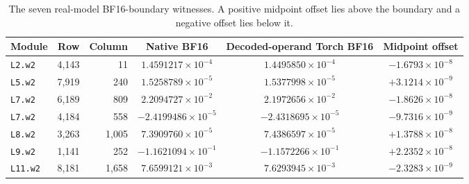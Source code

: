 \documentclass[11pt]{article}
\begin{document}
\begin{table}[H]
  \centering
  \scriptsize
  \caption{The seven real-model BF16-boundary witnesses.  A positive midpoint
  offset lies above the boundary and a negative offset lies below it.}
  \label{tab:gemm-witnesses}
  \begin{tabular}{@{}lrrccc@{}}
    \toprule
    Module & Row & Column & Native BF16 & Decoded-operand Torch BF16 & Midpoint offset \\
    \midrule
    \texttt{L2.w2}  & 4,143 & 11    & $1.4591217\!\times\!10^{-4}$  & $1.4495850\!\times\!10^{-4}$  & $-1.6793\!\times\!10^{-8}$ \\
    \texttt{L5.w2}  & 7,919 & 240   & $1.5258789\!\times\!10^{-5}$  & $1.5377998\!\times\!10^{-5}$  & $+3.1214\!\times\!10^{-9}$ \\
    \texttt{L7.w2}  & 6,189 & 809   & $2.2094727\!\times\!10^{-2}$  & $2.1972656\!\times\!10^{-2}$  & $-1.8626\!\times\!10^{-8}$ \\
    \texttt{L7.w2}  & 4,184 & 558   & $-2.4199486\!\times\!10^{-5}$ & $-2.4318695\!\times\!10^{-5}$ & $-9.7316\!\times\!10^{-9}$ \\
    \texttt{L8.w2}  & 3,263 & 1,005 & $7.3909760\!\times\!10^{-5}$  & $7.4386597\!\times\!10^{-5}$  & $+1.3788\!\times\!10^{-8}$ \\
    \texttt{L9.w2}  & 1,141 & 252   & $-1.1621094\!\times\!10^{-1}$ & $-1.1572266\!\times\!10^{-1}$ & $+2.2352\!\times\!10^{-8}$ \\
    \texttt{L11.w2} & 8,181 & 1,658 & $7.6599121\!\times\!10^{-3}$  & $7.6293945\!\times\!10^{-3}$  & $-2.3283\!\times\!10^{-9}$ \\
    \bottomrule
  \end{tabular}
\end{table}
\end{document}
